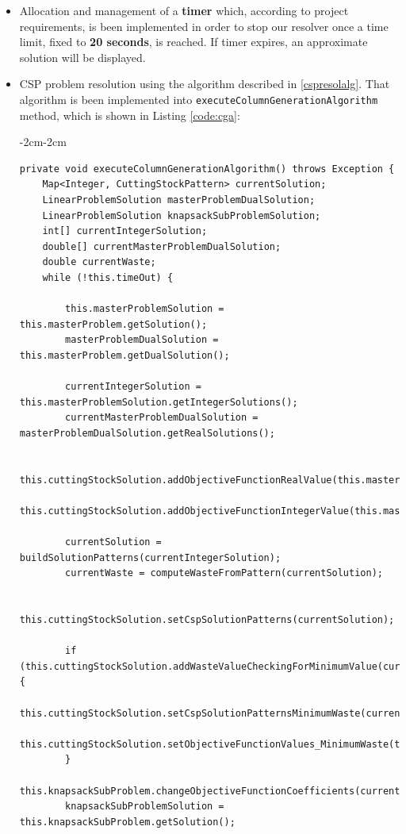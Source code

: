 \documentclass[10pt,a4paper]{article}
\begin{document}
\begin{itemize}
\item Allocation and management of a \textbf{timer} which, according to project requirements, is been implemented in order to stop our resolver once a time limit, fixed to \textbf{20 seconds}, is reached. If timer expires, an approximate solution will be displayed.

\item CSP problem resolution using the algorithm described in \ref{cspresolalg}. That algorithm is been implemented into \texttt{executeColumnGenerationAlgorithm} method, which is shown in Listing \ref{code:cga}:\\

\begin{adjustwidth}{-2cm}{-2cm}
\begin{lstlisting}[frame=lines, caption={\texttt{executeColumnGenerationAlgorithm()} method implementation.}, label={code:cga}]
private void executeColumnGenerationAlgorithm() throws Exception { 
    Map<Integer, CuttingStockPattern> currentSolution;
    LinearProblemSolution masterProblemDualSolution;
    LinearProblemSolution knapsackSubProblemSolution;
    int[] currentIntegerSolution;
    double[] currentMasterProblemDualSolution;
    double currentWaste;
    while (!this.timeOut) {

        this.masterProblemSolution = this.masterProblem.getSolution();
        masterProblemDualSolution = this.masterProblem.getDualSolution();

        currentIntegerSolution = this.masterProblemSolution.getIntegerSolutions();
        currentMasterProblemDualSolution = masterProblemDualSolution.getRealSolutions();

        this.cuttingStockSolution.addObjectiveFunctionRealValue(this.masterProblemSolution.getRealValueOfObjectiveFunction());
        this.cuttingStockSolution.addObjectiveFunctionIntegerValue(this.masterProblemSolution.getIntegerValueOfObjectiveFunction());

        currentSolution = buildSolutionPatterns(currentIntegerSolution);
        currentWaste = computeWasteFromPattern(currentSolution);

        this.cuttingStockSolution.setCspSolutionPatterns(currentSolution);

        if (this.cuttingStockSolution.addWasteValueCheckingForMinimumValue(currentWaste)) {
            this.cuttingStockSolution.setCspSolutionPatternsMinimumWaste(currentSolution);
            this.cuttingStockSolution.setObjectiveFunctionValues_MinimumWaste(this.masterProblemSolution.getIntegerValueOfObjectiveFunction());
        }
        this.knapsackSubProblem.changeObjectiveFunctionCoefficients(currentMasterProblemDualSolution);
        knapsackSubProblemSolution = this.knapsackSubProblem.getSolution();


\end{lstlisting}
\end{adjustwidth}
\end{itemize}
\end{document}
